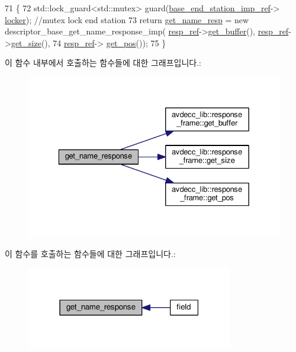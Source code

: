 \begin{DoxyCode}
71 \{
72     std::lock\_guard<std::mutex> guard(\hyperlink{classavdecc__lib_1_1descriptor__base__imp_a550c969411f5f3b69f55cc139763d224}{base\_end\_station\_imp\_ref}->
      \hyperlink{classavdecc__lib_1_1end__station__imp_a2207f93fef130266b292686bf96ef8d3}{locker}); \textcolor{comment}{//mutex lock end station}
73     \textcolor{keywordflow}{return} \hyperlink{classavdecc__lib_1_1descriptor__base__imp_a7d3a410eb242dc2b7abe9862a1593458}{get\_name\_resp} = \textcolor{keyword}{new} descriptor\_base\_get\_name\_response\_imp(
      \hyperlink{classavdecc__lib_1_1descriptor__base__imp_a2642e3a7c10d38553e7ff4a55e875346}{resp\_ref}->\hyperlink{classavdecc__lib_1_1response__frame_ad4680d622c198b5256c03b2eb2638c22}{get\_buffer}(), \hyperlink{classavdecc__lib_1_1descriptor__base__imp_a2642e3a7c10d38553e7ff4a55e875346}{resp\_ref}->\hyperlink{classavdecc__lib_1_1response__frame_adf55ed6a1edf8e1aa4f3f5f97936ad1e}{get\_size}(),
74                                                                      \hyperlink{classavdecc__lib_1_1descriptor__base__imp_a2642e3a7c10d38553e7ff4a55e875346}{resp\_ref}->
      \hyperlink{classavdecc__lib_1_1response__frame_a4038092b7b420000faefc768241adb42}{get\_pos}());
75 \}
\end{DoxyCode}


이 함수 내부에서 호출하는 함수들에 대한 그래프입니다.\+:
\nopagebreak
\begin{figure}[H]
\begin{center}
\leavevmode
\includegraphics[width=329pt]{classavdecc__lib_1_1descriptor__base__imp_abf130a286ee3ca9d1f41a7e2abbd0d33_cgraph}
\end{center}
\end{figure}




이 함수를 호출하는 함수들에 대한 그래프입니다.\+:
\nopagebreak
\begin{figure}[H]
\begin{center}
\leavevmode
\includegraphics[width=255pt]{classavdecc__lib_1_1descriptor__base__imp_abf130a286ee3ca9d1f41a7e2abbd0d33_icgraph}
\end{center}
\end{figure}


